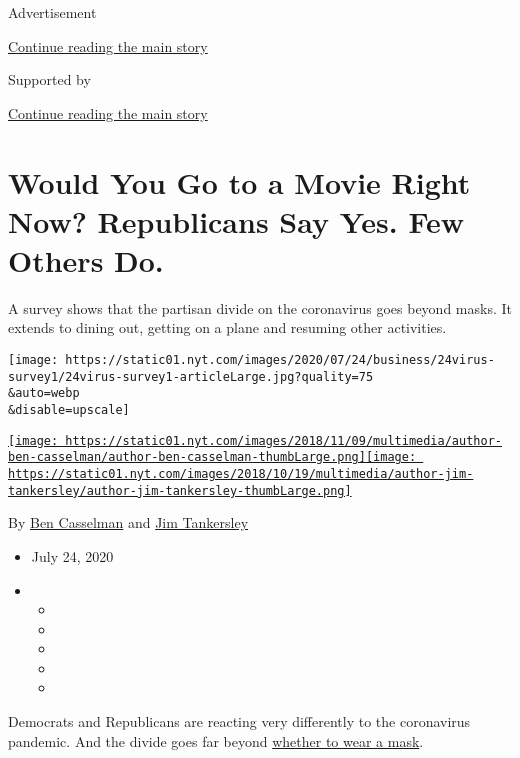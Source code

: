 Advertisement

\protect\hyperlink{after-top}{Continue reading the main story}

Supported by

\protect\hyperlink{after-sponsor}{Continue reading the main story}

\hypertarget{would-you-go-to-a-movie-right-now-republicans-say-yes-few-others-do}{%
\section{Would You Go to a Movie Right Now? Republicans Say Yes. Few
Others
Do.}\label{would-you-go-to-a-movie-right-now-republicans-say-yes-few-others-do}}

A survey shows that the partisan divide on the coronavirus goes beyond
masks. It extends to dining out, getting on a plane and resuming other
activities.

\texttt{[image: https://static01.nyt.com/images/2020/07/24/business/24virus-survey1/24virus-survey1-articleLarge.jpg?quality=75\\\&auto=webp\\\&disable=upscale]}

\href{https://www.nytimes.com/by/ben-casselman}{\texttt{[image: https://static01.nyt.com/images/2018/11/09/multimedia/author-ben-casselman/author-ben-casselman-thumbLarge.png]}}\href{https://www.nytimes.com/by/jim-tankersley}{\texttt{[image: https://static01.nyt.com/images/2018/10/19/multimedia/author-jim-tankersley/author-jim-tankersley-thumbLarge.png]}}

By \href{https://www.nytimes.com/by/ben-casselman}{Ben Casselman} and
\href{https://www.nytimes.com/by/jim-tankersley}{Jim Tankersley}

\begin{itemize}
\item
  July 24, 2020
\item
  \begin{itemize}
  \item
  \item
  \item
  \item
  \item
  \end{itemize}
\end{itemize}

Democrats and Republicans are reacting very differently to the
coronavirus pandemic. And the divide goes far beyond
\href{https://www.nytimes.com/interactive/2020/07/17/upshot/coronavirus-face-mask-map.html}{whether
to wear a mask}.

